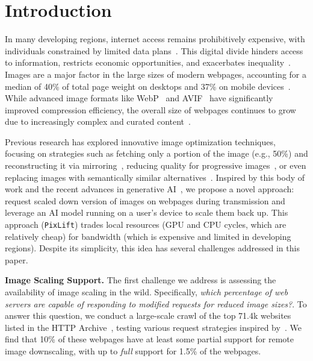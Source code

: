\documentclass[acmsmall]{acmart}
\newcommand{\tool}{{PixLift}\xspace}
\newcommand{\eg}{{e.g.,}\xspace}
\begin{document}
\section{Introduction}
In many developing regions, internet access remains prohibitively expensive, with individuals constrained by limited data plans~\cite{LUMS_web_affordability, affordability_dev}. This digital divide hinders access to information, restricts economic opportunities, and exacerbates inequality~\cite{digital_divide, lythreatis2022digital}. Images are a major factor in the large sizes of modern webpages, accounting for a median of 40\% of total page weight on desktops and 37\% on mobile devices~\cite{http_archieve}. While advanced image formats like WebP~\cite{webp} and AVIF~\cite{avif}  have significantly improved compression efficiency, the overall size of webpages continues to grow due to increasingly complex and curated content~\cite{http_archieve}.

Previous research has explored innovative image optimization techniques, focusing on strategies such as fetching only a portion of the image (\eg 50\%) and reconstructing it via mirroring~\cite{browseLite}, reducing quality for progressive images~\cite{browseLite}, or even replacing images with semantically similar alternatives~\cite{webLego}.  Inspired by this body of work and the recent advances in generative AI~\cite{hassan2024, aldahoul2023, sesrm5, quicksrnet, srsubpixelcnn}, we propose a novel approach: request scaled down version of images on webpages during transmission and leverage an AI model running on a user’s device to scale them back up. This approach (\texttt{\tool}) trades local resources (GPU and CPU cycles, which are relatively cheap) for bandwidth (which is expensive and limited in developing regions). Despite its simplicity, this idea has several challenges addressed in this paper.

\vspace{0.05in}
\noindent
\textbf{Image Scaling Support.} The first challenge we address is assessing the availability of image scaling in the wild. Specifically, \textit{which percentage of web servers are capable of responding to modified requests for reduced image sizes?}. To answer this question, we conduct a large-scale crawl of the top 71.4k websites listed in the HTTP Archive~\cite{http_archieve}, testing various request strategies inspired by~\cite{browseLite}. We find that 10\% of these webpages have at least some partial support for remote image downscaling, with up to \textit{full} support for 1.5\% of the webpages. 
\end{document}
